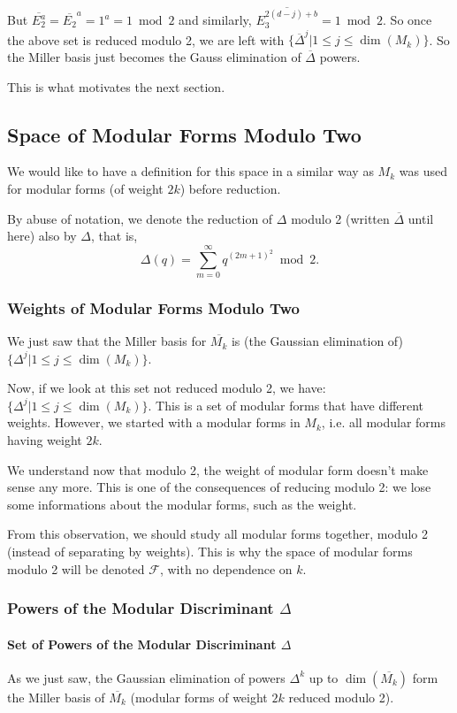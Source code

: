 But $\overline{E_2^a} = \overline{E_2}^a = 1^a = 1 \bmod 2$ and similarly, $\overline{E_3^{2(d-j)+b}} = 1 \bmod 2$.
So once the above set is reduced modulo 2, we are left with $\{ \overline{\Delta}^j | 1 \leq j \leq \dim(M_k) \}$.
So the Miller basis just becomes the Gauss elimination of $\overline{\Delta}$ powers.

This is what motivates the next section.



\subsection{Space of Modular Forms Modulo Two}
We would like to have a definition for this space in a similar way as $M_k$ was used for modular forms (of weight $2k$) before reduction.

By abuse of notation, we denote the reduction of $\Delta$ modulo 2 (written $\overline{\Delta}$ until here) also by $\Delta$, that is,
$$
\Delta(q) = \sum_{m=0}^{\infty} q^{(2m+1)^2} \bmod 2.
$$
\subsubsection{Weights of Modular Forms Modulo Two}
\label{WeightModuloTwo}
We just saw that the Miller basis for $\overline{M_k}$ is (the Gaussian elimination of) $\{ \Delta^j | 1 \leq j \leq \dim(M_k) \}$.

Now, if we look at this set not reduced modulo 2, we have:
$\{ \Delta^j | 1 \leq j \leq \dim(M_k) \}$.
This is a set of modular forms that have different weights.
However, we started with a modular forms in $M_k$, i.e. all modular forms having weight $2k$.

We understand now that modulo 2, the weight of modular form doesn't make sense any more.
This is one of the consequences of reducing modulo 2: we lose some informations about the modular forms, such as the weight.

From this observation, we should study all modular forms together, modulo 2 (instead of separating by weights).
This is why the space of modular forms modulo 2 will be denoted  $\mathcal{F}$, with no dependence on $k$.

\subsubsection{Powers of the Modular Discriminant $\Delta$}
\paragraph{Set of Powers of the Modular Discriminant $\Delta$}
As we just saw, the Gaussian elimination of powers $\Delta^k$ up to $\dim(\overline{M_k})$ form the Miller basis of $\overline{M_k}$ (modular forms of weight $2k$ reduced modulo 2).

